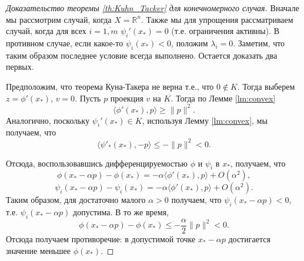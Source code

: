 \documentclass[a4paper,12pt]{report}
\begin{document}
\begin{proof}[Доказательство теоремы \ref{th:Kuhn_Tacker} для конечномерного случая]
 	Вначале мы рассмотрим случай, когда $X=\mathbb{R}^n$. Также мы для упрощения рассматриваем случай, когда для всех $i=\overline{1,m}$ $\psi_i'(x_*)=0$ (т.е. ограничения активны). В противном случае, если какое-то $\psi_i(x_*)<0$, положим $\lambda_i=0$. Заметим, что таким образом последнее условие всегда выполнено. Остается доказать два первых. 
 	
 	Предположим, что теорема Куна-Такера не верна т.е., что $0\notin K$. Тогда выберем $z=\phi'(x_*)$, $v=0$. Пусть $p$ проекция $v$ на $K$. Тогда по Лемме \ref{lm:convex}
 	$$\langle \phi'(x_*),p\rangle\geq \|p\|^2. $$ Аналогично, поскольку $\psi_i'(x_*)\in K$, используя Лемму \ref{lm:convex}, мы получаем, что
 	$$\langle \psi'_*(x_*), -p\rangle\leq -\|p\|^2<0. $$
 	
 	Отсюда,  воспользовавшись дифференцируемостью $\phi$ и $\psi_i$ в $x_*$, получаем, что
 	$$\phi(x_*-\alpha p)-\phi(x_*)=-\alpha \langle \phi'(x_*),p\rangle +O(\alpha^2), $$
 	$$\psi_i(x_*-\alpha p)-\psi_i(x_*)=-\alpha \langle \phi'(x_*),p\rangle +O(\alpha^2). $$ Таким образом, для достаточно малого $\alpha>0$ получаем, что $\psi_i(x_*-\alpha p)<0$, т.е. $\psi_i(x_*-\alpha p)$ допустима. В то же время,
 	$$\phi(x_*-\alpha p)-\phi(x_*)\leq -\frac{\alpha}{2}\|p\|^2<0. $$ Отсюда получаем противоречие: в допустимой точке $x_*-\alpha p$ достигается значение меньшее $\phi(x_*)$.
 	
 	
\end{proof}
\end{document}
